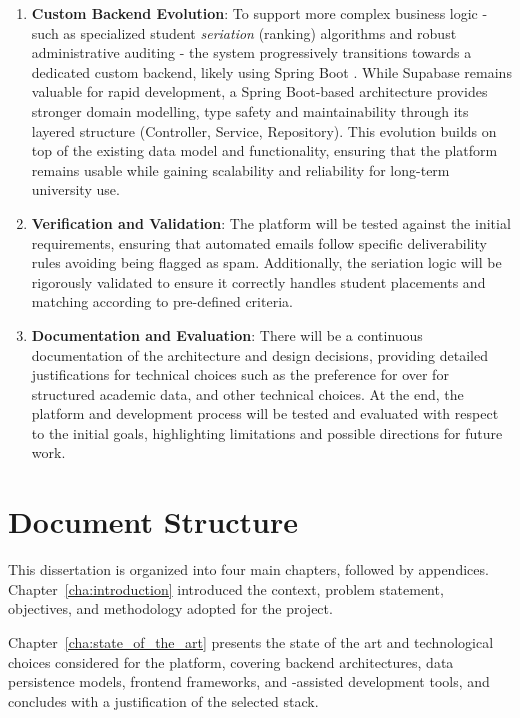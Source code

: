 \begin{enumerate}
{      }
    \item{
      \textbf{Custom Backend Evolution}: 
      To support more complex business logic - such as specialized student \textit{seriation} (ranking) algorithms and robust administrative auditing - 
      the system progressively transitions towards a dedicated custom backend, 
      likely using Spring Boot \cite{springboot-docs-3x}. 
      While Supabase remains valuable for rapid development, a Spring Boot-based architecture provides stronger domain modelling, 
      type safety and maintainability through its layered structure 
      (Controller, Service, Repository). 
      This evolution builds on top of the existing data model and functionality, ensuring that the platform remains usable while 
      gaining scalability and reliability for long-term university use.
      }
    \item{\textbf{Verification and Validation}: 
      The platform will be tested against the initial requirements, 
      ensuring that automated emails follow specific deliverability rules avoiding being flagged as spam.
      Additionally, the seriation logic will be rigorously validated to ensure it correctly handles student placements and matching according to pre-defined criteria.
      }
    \item{
      \textbf{Documentation and Evaluation}: 
      There will be a continuous documentation of the architecture and design decisions, 
      providing detailed justifications for technical choices such as the preference for  
      over  for structured academic data, and other technical choices.
      At the end, the platform and development process will be tested and evaluated with respect to the initial goals,
      highlighting limitations and possible directions for future work. 
      }
  \end{enumerate}

\section{Document Structure}
  \label{sec:intro_doc_structure}
  
  {
    This dissertation is organized into four main chapters, followed by appendices.
    Chapter~\ref{cha:introduction} introduced the context, problem statement, objectives, and methodology 
    adopted for the project.
  }

  {
    Chapter~\ref{cha:state_of_the_art} presents the state of the art and technological choices considered for the platform,
    covering backend architectures, data persistence models, frontend frameworks, and -assisted development tools,
    and concludes with a justification of the selected stack.
  }

